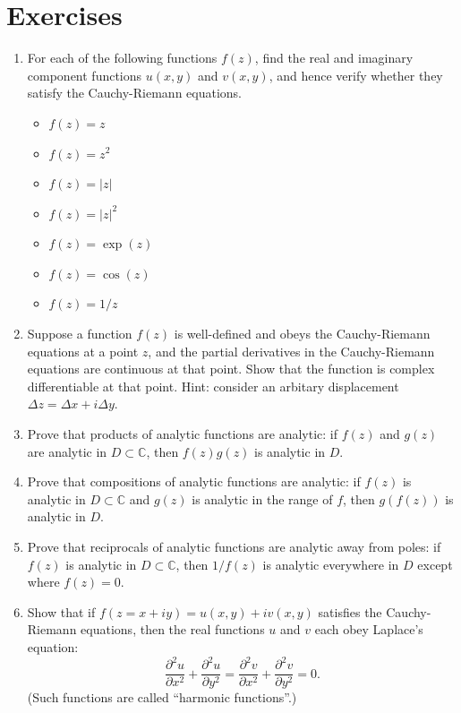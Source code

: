 \documentclass[10pt,a4paper]{article}
\begin{document}
\section{Exercises}

\begin{enumerate}
\item
For each of the following functions $f(z)$, find the real and
imaginary component functions $u(x,y)$ and $v(x,y)$, and hence verify
whether they satisfy the Cauchy-Riemann equations.
\begin{itemize}
\item $f(z) = z$
\item $f(z) = z^2$
\item $f(z) = |z|$
\item $f(z) = |z|^2$
\item $f(z) = \exp(z)$
\item $f(z) = \cos(z)$
\item $f(z) = 1/z$
\end{itemize}

\item
Suppose a function $f(z)$ is well-defined and obeys the Cauchy-Riemann
equations at a point $z$, and the partial derivatives in the
Cauchy-Riemann equations are continuous at that point. Show that the
function is complex differentiable at that point. Hint: consider an
arbitary displacement $\Delta z = \Delta x + i \Delta y$.

\item
Prove that products of analytic functions are analytic: if $f(z)$ and
$g(z)$ are analytic in $D \subset \mathbb{C}$, then $f(z) g(z)$ is
analytic in $D$.

\item
Prove that compositions of analytic functions are analytic: if $f(z)$
is analytic in $D \subset \mathbb{C}$ and $g(z)$ is analytic in the
range of $f$, then $g(f(z))$ is analytic in $D$.

\item
Prove that reciprocals of analytic functions are analytic away from
poles: if $f(z)$ is analytic in $D \subset \mathbb{C}$, then
$1/f(z)$ is analytic everywhere in $D$ except where $f(z) = 0$.

\item
Show that if $f(z = x + iy) = u(x,y) + i v(x,y)$ satisfies the
Cauchy-Riemann equations, then the real functions $u$ and $v$ each
obey Laplace's equation:
\begin{equation}
  \frac{\partial^2 u}{\partial x^2} + \frac{\partial^2u}{\partial y^2}
  = \frac{\partial^2 v}{\partial x^2} + \frac{\partial^2 v}{\partial y^2} = 0.
\end{equation}
(Such functions are called ``harmonic functions''.)


\end{enumerate}
\end{document}
